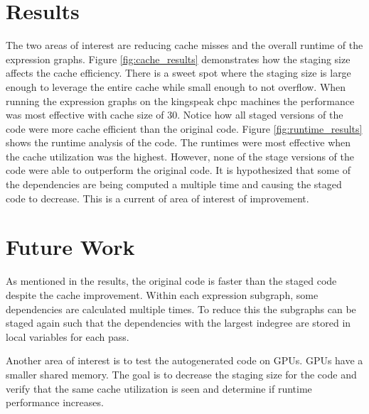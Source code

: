 \documentclass[10pt, conference]{IEEEtran} %
\begin{document}
\section{Results}
The two areas of interest are reducing cache misses and the overall runtime of the expression graphs. Figure \ref{fig:cache_results} demonstrates how the staging size affects the cache efficiency. There is a sweet spot where the staging size is large enough to leverage the entire cache while small enough to not overflow. When running the expression graphs on the kingspeak chpc machines the performance was most effective with cache size of 30. Notice how all staged versions of the code were more cache efficient than the original code. 
Figure \ref{fig:runtime_results} shows the runtime analysis of the code. The runtimes were most effective when the cache utilization was the highest. However, none of the stage versions of the code were able to outperform the original code. It is hypothesized that some of the dependencies are being computed a multiple time and causing the staged code to decrease. This is a current of area of interest of improvement.


\section{Future Work}
As mentioned in the results, the original code is faster than the staged code despite the cache improvement. Within each expression subgraph, some dependencies are calculated multiple times. To reduce this the subgraphs can be staged again such that the dependencies with the largest indegree are stored in local variables for each pass.

Another area of interest is to test the autogenerated code on GPUs. GPUs have a smaller shared memory. The goal is to decrease the staging size for the code and verify that the same cache utilization is seen and determine if runtime performance increases.







\end{document}
